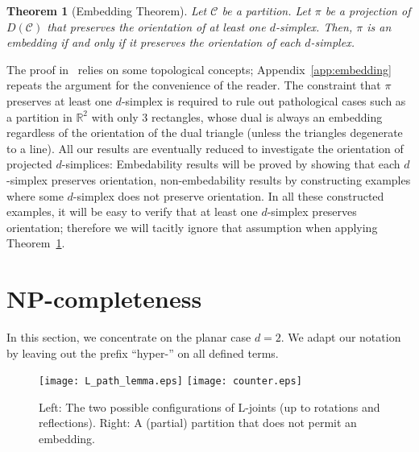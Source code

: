 \documentclass[12pt]{article}
\newcommand{\R}{\mathbb{R}}
\newcommand{\partition}{\mathcal{C}}
\newtheorem{theorem}{Theorem}
\begin{document}
\begin{theorem}[Embedding Theorem]\label{thm:embedding}
Let $\partition$ be a partition.
Let $\pi$ be a projection of $D(\partition)$ that preserves
the orientation of at least one $d$-simplex.
Then, $\pi$ is an embedding if and only if 
it preserves the orientation of each $d$-simplex.
\end{theorem}

The proof in~\cite{ek-freudenthal} relies on some topological concepts;
Appendix~\ref{app:embedding} repeats the argument for the convenience of the reader.
The constraint that $\pi$ preserves at least one $d$-simplex
is required to rule out pathological cases such as a partition in $\R^2$
with only $3$ rectangles, whose dual is always an embedding regardless of the orientation
of the dual triangle (unless the triangles degenerate to a line).
All our results are eventually reduced to investigate
the orientation of projected $d$-simplices: Embedability results will be proved
by showing that each $d$-simplex preserves orientation, non-embedability results
by constructing examples where some $d$-simplex does not preserve orientation.
In all these constructed examples, it will be easy to verify
that at least one $d$-simplex preserves orientation; therefore we will tacitly
ignore that assumption when applying Theorem~\ref{thm:embedding}.


\section{NP-completeness}
\label{sec:NP}

In this section, we concentrate on the planar case $d=2$. We adapt our notation
by leaving out the prefix ``hyper-'' on all defined terms.

\begin{figure}
\begin{center}
\texttt{[image: L\_path\_lemma.eps]}
\hspace{2cm}
\texttt{[image: counter.eps]}
\end{center}
\caption{Left: The two possible configurations of L-joints (up to rotations and reflections).
Right: A (partial) partition that does not permit an embedding.}
\label{fig:L-joint}
\label{fig:counter}
\end{figure}
\end{document}
